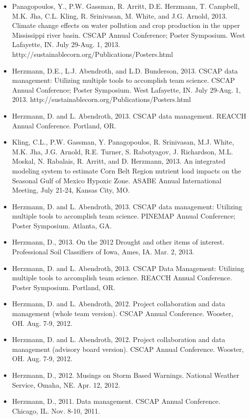 \begin{itemize}
\item Panagopoulos, Y., P.W. Gassman, R. Arritt, D.E. Herzmann, T. Campbell, M.K. Jha, C.L. Kling, R. Srinivasan, M. White, and J.G. Arnold, 2013. Climate change effects on water pollution and crop production in the upper Mississippi river basin. CSCAP Annual Conference; Poster Symposium. West Lafayette, IN. July 29-Aug. 1, 2013. http://sustainablecorn.org/Publications/Posters.html
\item Herzmann, D.E., L.J. Abendroth, and L.D. Bunderson, 2013. CSCAP data management: Utilizing multiple tools to accomplish team science. CSCAP Annual Conference; Poster Symposium. West Lafayette, IN. July 29-Aug. 1, 2013. http://sustainablecorn.org/Publications/Posters.html
\item Herzmann, D. and L. Abendroth, 2013. CSCAP data management. REACCH Annual Conference. Portland, OR. 
\item Kling, C.L., P.W. Gassman, Y. Panagopoulos, R. Srinivasan, M.J. White, M.K. Jha, J.G. Arnold, R.E. Turner, S. Rabotyagov, J. Richardson, M.L. Moskal, N. Rabalais, R. Arritt, and D. Herzmann, 2013. An integrated modeling system to estimate Corn Belt Region nutrient load impacts on the Seasonal Gulf of Mexico Hypoxic Zone. ASABE Annual International Meeting, July 21-24, Kansas City, MO. 
\item Herzmann, D. and L. Abendroth, 2013. CSCAP data management: Utilizing multiple tools to accomplish team science. PINEMAP Annual Conference; Poster Symposium. Atlanta, GA. 
\item Herzmann, D., 2013. On the 2012 Drought and other items of interest. Professional Soil Classifiers of Iowa, Ames, IA. Mar. 2, 2013.
\item Herzmann, D. and L. Abendroth, 2013. CSCAP Data Management: Utilizing multiple tools to accomplish team science. REACCH Annual Conference. Poster Symposium. Portland, OR.
\item Herzmann, D. and L. Abendroth, 2012. Project collaboration and data management (whole team version). CSCAP Annual Conference. Wooster, OH. Aug. 7-9, 2012. 
\item Herzmann, D. and L. Abendroth, 2012. Project collaboration and data management (advisory board version). CSCAP Annual Conference. Wooster, OH. Aug. 7-9, 2012.
\item Herzmann, D., 2012. Musings on Storm Based Warnings. National Weather Service, Omaha, NE. Apr. 12, 2012.
\item Herzmann, D., 2011. Data management. CSCAP Annual Conference. Chicago, IL. Nov. 8-10, 2011. 

\end{itemize}
